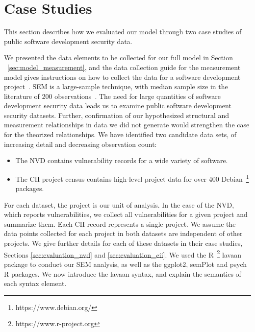 \section{Case Studies}
\label{sec:evaluation}
This section describes how we evaluated our model through two case studies of public software development security data.

We presented the data elements to be collected for our full model in Section ~\ref{sec:model_measurement}, and the data collection guide for the measurement model gives instructions on how to collect the data for a software development project~\cite{morrison2016spefsite}. SEM is a large-sample technique, with median sample size in the literature of 200 observations~\cite{kline2015principles}. The need for large quantities of software development security data leads us to examine public software development security datasets. Further, confirmation of our hypothesized structural and measurement relationships in data we did not generate would strengthen the case for the theorized relationships.
We have identified two candidate data sets, of increasing detail and decreasing observation count: 
\begin{itemize}
\item The NVD contains vulnerability records for a wide variety of software.
\item The CII project census contains high-level project data for over 400 Debian~\footnote{https://www.debian.org/} packages.
\end{itemize}

For each dataset, the project is our unit of analysis. In the case of the NVD, which reports vulnerabilities, we collect all vulnerabilities for a given project and summarize them. Each CII record represents a single project. We assume the data points collected for each project in both datasets are independent of other projects.  We give further details for each of these datasets in their case studies, Sections \ref{sec:evaluation_nvd} and \ref{sec:evaluation_cii}. We used the R~\footnote{https://www.r-project.org} lavaan package to conduct our SEM analysis, as well as the ggplot2, semPlot and psych R packages. We now introduce the lavaan syntax, and explain the semantics of each syntax element.


